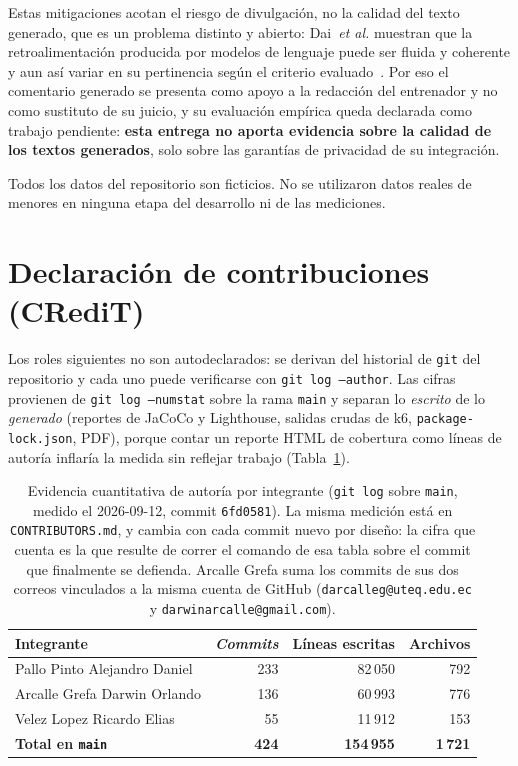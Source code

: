\documentclass[11pt,a4paper]{article}
\newcommand{\ruta}[1]{\texttt{\footnotesize #1}}
\begin{document}
Estas mitigaciones acotan el riesgo de divulgación, no la calidad del texto
generado, que es un problema distinto y abierto: Dai~\emph{et al.} muestran
que la retroalimentación producida por modelos de lenguaje puede ser fluida
y coherente y aun así variar en su pertinencia según el
criterio evaluado~\cite{dai2024feedback}. Por eso el comentario generado se
presenta como apoyo a la redacción del entrenador y no como sustituto de su
juicio, y su evaluación empírica queda declarada como trabajo pendiente:
\textbf{esta entrega no aporta evidencia sobre la calidad de los textos
generados}, solo sobre las garantías de privacidad de su integración.

Todos los datos del repositorio son ficticios. No se utilizaron datos reales
de menores en ninguna etapa del desarrollo ni de las mediciones.

\section{Declaración de contribuciones (CRediT)}
\label{sec:credit}

Los roles siguientes no son autodeclarados: se derivan del historial de
\texttt{git} del repositorio y cada uno puede verificarse con
\texttt{git log --author}. Las cifras provienen de \texttt{git log
--numstat} sobre la rama \texttt{main} y separan lo \emph{escrito} de lo
\emph{generado} (reportes de JaCoCo y Lighthouse, salidas crudas de k6,
\texttt{package-lock.json}, PDF), porque contar un reporte HTML de
cobertura como líneas de autoría inflaría la medida sin reflejar trabajo
(Tabla~\ref{tab:credit-cifras}).

\begin{table}[htbp]
\centering
\caption{Evidencia cuantitativa de autoría por integrante (\texttt{git log} sobre \texttt{main}, medido el 2026-09-12, commit \texttt{6fd0581}). La misma medición está en \ruta{CONTRIBUTORS.md}, y cambia con cada commit nuevo por diseño: la cifra que cuenta es la que resulte de correr el comando de esa tabla sobre el commit que finalmente se defienda. Arcalle Grefa suma los commits de sus dos correos vinculados a la misma cuenta de GitHub (\texttt{darcalleg@uteq.edu.ec} y \texttt{darwinarcalle@gmail.com}).}
\label{tab:credit-cifras}
\begin{tabular}{@{}lrrr@{}}
\toprule
\textbf{Integrante} & \textbf{\emph{Commits}} & \textbf{Líneas escritas} & \textbf{Archivos} \\
\midrule
Pallo Pinto Alejandro Daniel & 233 & 82\,050 & 792 \\
Arcalle Grefa Darwin Orlando & 136 & 60\,993 & 776 \\
Velez Lopez Ricardo Elias & 55 & 11\,912 & 153 \\
\midrule
\textbf{Total en \texttt{main}} & \textbf{424} & \textbf{154\,955} & \textbf{1\,721} \\
\bottomrule
\end{tabular}
\end{table}
\end{document}
